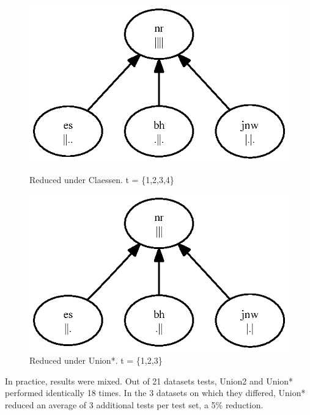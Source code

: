 \documentclass[11pt,twoside]{article}
\theoremstyle{definition}
\begin{document}
\begin{figure}

\includegraphics{toy.ps}
\caption{Reduced under Claessen. t = \{1,2,3,4\}}
\includegraphics{toyb.ps}
\caption{Reduced under Union*. t = \{1,2,3\}}
\end{figure}


In practice, results were mixed. Out of 21 datasets tests, Union2 and Union* performed identically 18 times. In the 3 datasets on which they differed, Union* reduced an average of 3 additional tests per test set, a 5\% reduction.
\end{document}
